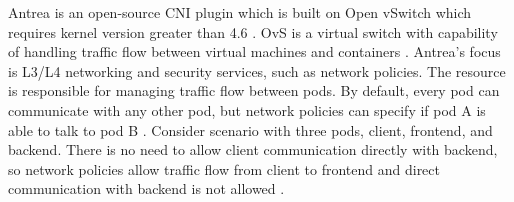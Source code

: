 \begin{table}[h!]
    \centering
    \caption{Comparison of Antrea and Cilium \cite{AntreaDocs}\cite{CiliumDocs}.}
    \label{tab:antrea_cilium}
\end{table}


Antrea is an open-source CNI plugin which is built on Open vSwitch which requires kernel version greater than 4.6 \cite{AntreaDocs}. OvS is a virtual switch with capability of handling traffic flow between virtual machines and containers \cite{OvS}. Antrea's focus is L3/L4 networking and security services, such as network policies. The resource is responsible for managing traffic flow between pods. By default, every pod can communicate with any other pod, but network policies can specify if pod A is able to talk to pod B \cite{KubernetesDocs}. Consider scenario with three pods, client, frontend, and backend. There is no need to allow client communication directly with backend, so network policies allow traffic flow from client to frontend and direct communication with backend is not allowed \cite{CalicoDocs}. 


